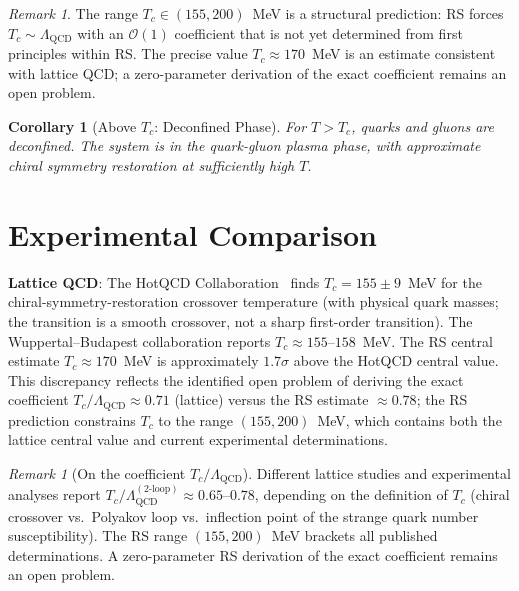 \documentclass[12pt,a4paper]{article}
\newtheorem{corollary}[theorem]{Corollary}
\theoremstyle{definition}
\theoremstyle{remark}
\newtheorem{remark}[theorem]{Remark}
\begin{document}
\begin{remark}
\label{rem:tc-status}
The range $T_c \in (155, 200)$~MeV is a structural prediction: RS forces
$T_c \sim \Lambda_{\mathrm{QCD}}$ with an $\mathcal{O}(1)$ coefficient
that is not yet determined from first principles within RS.  The precise
value $T_c \approx 170$~MeV is an estimate consistent with lattice QCD;
a zero-parameter derivation of the exact coefficient remains an open problem.
\end{remark}

\begin{corollary}[Above $T_c$: Deconfined Phase]
\label{cor:deconfined}
For $T > T_c$, quarks and gluons are deconfined.  The system is in
the quark-gluon plasma phase, with approximate chiral symmetry
restoration at sufficiently high $T$.
\end{corollary}

\section{Experimental Comparison}
\label{sec:experiment}

\textbf{Lattice QCD}: The HotQCD Collaboration~\cite{HotQCD} finds
$T_c = 155 \pm 9$~MeV for the chiral-symmetry-restoration crossover
temperature (with physical quark masses; the transition is a smooth
crossover, not a sharp first-order transition).  The
Wuppertal--Budapest collaboration reports $T_c \approx 155$--$158$~MeV.
The RS central estimate $T_c \approx 170$~MeV is approximately
$1.7\sigma$ above the HotQCD central value.  This discrepancy reflects
the identified open problem of deriving the exact coefficient
$T_c/\Lambda_{\mathrm{QCD}} \approx 0.71$ (lattice) versus the RS
estimate $\approx 0.78$; the RS prediction constrains $T_c$ to the
range $(155, 200)$~MeV, which contains both the lattice central value
and current experimental determinations.

\begin{remark}[On the coefficient $T_c/\Lambda_{\mathrm{QCD}}$]
Different lattice studies and experimental analyses report
$T_c/\Lambda_{\mathrm{QCD}}^{(2\text{-loop})} \approx 0.65$--$0.78$,
depending on the definition of $T_c$ (chiral crossover vs.\ Polyakov
loop vs.\ inflection point of the strange quark number susceptibility).
The RS range $(155, 200)$~MeV brackets all published determinations.
A zero-parameter RS derivation of the exact coefficient remains
an open problem.
\end{remark}
\end{document}
